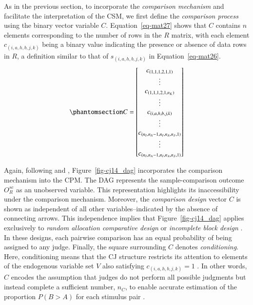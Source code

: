 \documentclass[
  authoryear,
  review,
  1p]{elsarticle}
\begin{document}
As in the previous section, to incorporate the \emph{comparison
mechanism} and facilitate the interpretation of the CSM, we first define
the \emph{comparison process} using the binary vector variable \(C\).
Equation~\ref{eq-mat27} shows that \(C\) contains \(n\) elements
corresponding to the number of rows in the \(R\) matrix, with each
element \(c_{(i,a,h,b,j,k)}\) being a binary value indicating the
presence or absence of data rows in \(R\), a definition similar to that
of \(s_{(i,a,h,b,j,k)}\) in Equation~\ref{eq-mat26}.
\begin{equation}\protect\phantomsection\label{eq-mat27}{
C = \begin{bmatrix}
c_{(1,1,1,2,1,1)} \\
\vdots \\
c_{(1,1,1,2,1,n_{K})} \\
\vdots \\
c_{(i,a,h,b,j,k)} \\
\vdots \\
c_{(n_{I},n_{A}-1,n_{I},n_{A},n_{J},1)} \\
\vdots \\
c_{(n_{I},n_{A}-1,n_{I},n_{A},n_{J},1)}
\end{bmatrix}
}\end{equation}

Again, following \citet{Bareinboim_et_al_2014} and
\citet{Schuessler_et_al_2023}, Figure~\ref{fig-cj14_dag} incorporates
the comparison mechanism into the CPM. The DAG represents the
sample-comparison outcome \(O^{sc}_{R}\) as an unobserved variable. This
representation highlights its inaccessibility under the comparison
mechanism. Moreover, the \emph{comparison design} vector \(C\) is shown
as independent of all other variables--indicated by the absence of
connecting arrows. This independence implies that
Figure~\ref{fig-cj14_dag} applies exclusively to \emph{random allocation
comparative design} \citep{Bramley_2015} or \emph{incomplete block
design} \citep{Lawson_2015}. In these designs, each pairwise comparison
has an equal probability of being assigned to any judge. Finally, the
square surrounding \(C\) denotes \emph{conditioning}. Here, conditioning
means that the CJ structure restricts its attention to elements of the
endogenous variable set \(V\) also satisfying \(c_{(i,a,h,b,j,k)} = 1\)
\citep{Neal_2020, McElreath_2020}. In other words, \(C\) encodes the
assumption that judges do not perform all possible judgments but instead
complete a sufficient number, \(n_{C}\), to enable accurate estimation
of the proportion \(P(B > A)\) for each stimulus pair
\citep[p.~267]{Thurstone_1927b}.
\end{document}

